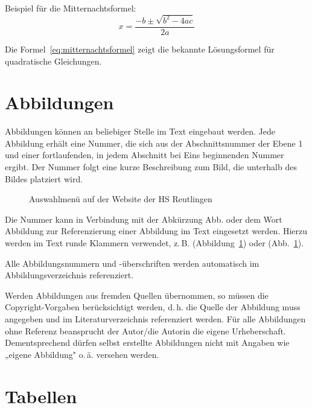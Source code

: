 Beispiel für die Mitternachtsformel:
\begin{equation}
	x = \frac{-b \pm \sqrt{b^2 - 4ac}}{2a}
	\label{eq:mitternachtsformel}
\end{equation}

Die Formel~\ref{eq:mitternachtsformel} zeigt die bekannte Lösungsformel für quadratische Gleichungen.

\section{Abbildungen}
\label{sec:abbildungen}

Abbildungen können an beliebiger Stelle im Text eingebaut werden. Jede Abbildung erhält eine Nummer, die sich aus der Abschnittsnummer der Ebene 1 und einer fortlaufenden, in jedem Abschnitt bei Eins beginnenden Nummer ergibt. Der Nummer folgt eine kurze Beschreibung zum Bild, die unterhalb des Bildes platziert wird.

\begin{figure}[h]
	\centering
	\caption{Auswahlmenü auf der Website der HS Reutlingen}
	\label{fig:hs_website}
\end{figure}

Die Nummer kann in Verbindung mit der Abkürzung Abb. oder dem Wort Abbildung zur Referenzierung einer Abbildung im Text eingesetzt werden. Hierzu werden im Text runde Klammern verwendet, z.\,B. (Abbildung~\ref{fig:hs_website}) oder (Abb.~\ref{fig:hs_website}).

Alle Abbildungsnummern und -überschriften werden automatisch im Abbildungsverzeichnis referenziert.

Werden Abbildungen aus fremden Quellen übernommen, so müssen die Copyright-Vorgaben berücksichtigt werden, d.\,h. die Quelle der Abbildung muss angegeben und im Literaturverzeichnis referenziert werden. Für alle Abbildungen ohne Referenz beansprucht der Autor/die Autorin die eigene Urheberschaft. Dementsprechend dürfen selbst erstellte Abbildungen nicht mit Angaben wie „eigene Abbildung" o.\,ä. versehen werden.

\section{Tabellen}
\label{sec:tabellen}


